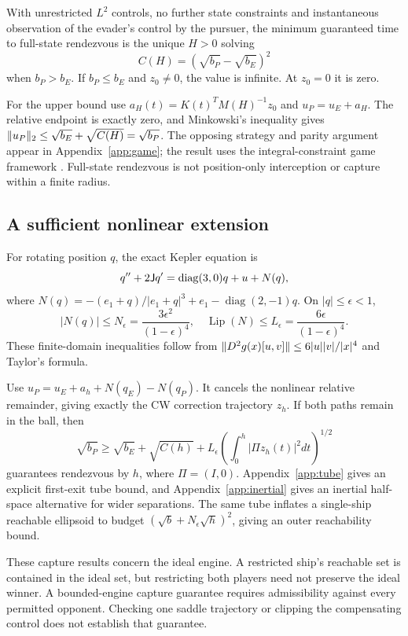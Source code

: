 \begin{theorem}
With unrestricted $L^2$ controls, no further state constraints and
instantaneous observation of the evader's control by the pursuer,
the minimum guaranteed time to full-state rendezvous is the unique
$H>0$ solving
\begin{equation}
 C(H)=(\sqrt{b_P}-\sqrt{b_E})^2
\end{equation}
when $b_P>b_E$. If $b_P\le b_E$ and $z_0\ne0$, the value is
infinite. At $z_0=0$ it is zero.
\end{theorem}
For the upper bound use $a_H(t)=K(t)^TM(H)^{-1}z_0$ and
$u_P=u_E+a_H$. The relative endpoint is exactly zero, and
Minkowski's inequality gives
$\lVert u_P\rVert_2\le\sqrt{b_E}+\sqrt{C(H)}=\sqrt{b_P}$.
The opposing strategy and parity argument appear in
Appendix~\ref{app:game}; the result uses the integral-constraint
game framework \cite{Ibragimov2011}.
Full-state rendezvous is not position-only interception or capture
within a finite radius.

\subsection{A sufficient nonlinear extension}
For rotating position $q$, the exact Kepler equation is
\begin{equation}
 q''+2\mathsf J q'=\operatorname{diag}(3,0)q+u+N(q),
\end{equation}
where
$N(q)=-(e_1+q)/|e_1+q|^3+e_1-\operatorname{diag}(2,-1)q$.
On $|q|\le\epsilon<1$,
\begin{equation}
 |N(q)|\le N_\epsilon=\frac{3\epsilon^2}{(1-\epsilon)^4},\quad
 \operatorname{Lip}(N)\le L_\epsilon=
                   \frac{6\epsilon}{(1-\epsilon)^4}.
\end{equation}
These finite-domain inequalities follow from
$\lVert D^2g(x)[u,v]\rVert\le6|u||v|/|x|^4$ and Taylor's formula.

Use
$u_P=u_E+a_h+N(q_E)-N(q_P)$. It cancels the nonlinear relative
remainder, giving exactly the CW correction trajectory $z_h$.
If both paths remain in the ball, then
\begin{equation}
 \sqrt{b_P}\ge\sqrt{b_E}+\sqrt{C(h)}
       +L_\epsilon\left(\int_0^h|\Pi z_h(t)|^2dt\right)^{1/2}
 \label{eq:cwcert}
\end{equation}
guarantees rendezvous by $h$, where $\Pi=(I,0)$.
Appendix~\ref{app:tube} gives an explicit first-exit tube bound, and Appendix~\ref{app:inertial} gives an inertial half-space alternative for wider separations.
The same tube inflates a single-ship reachable ellipsoid to budget
$(\sqrt b+N_\epsilon\sqrt h)^2$, giving an outer reachability bound.

These capture results concern the ideal engine. A restricted ship's
reachable set is contained in the ideal set, but restricting both
players need not preserve the ideal winner. A bounded-engine capture
guarantee requires admissibility against every permitted opponent.
Checking one saddle trajectory or clipping the compensating control
does not establish that guarantee.
